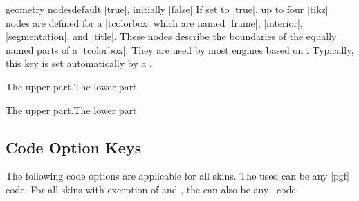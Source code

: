 \begin{docTcbKey}{geometry nodes}{}{default |true|, initially |false|}
  If set to |true|, up to four |tikz| nodes are defined for a |tcolorbox|
  which are named |frame|, |interior|, |segmentation|, and |title|. These nodes
  describe the boundaries of the equally named parts of a |tcolorbox|.
  They are used by most engines based on \tikzname.
  Typically, this key is set automatically by a .
\begin{dispExample}

\begin{tcolorbox}[adjusted title=The title]
  The upper part.\tcblower The lower part.
\end{tcolorbox}
\begin{tcolorbox}[enhanced,adjusted title=The title,
  frame code={\path[draw=red,fill=red!25]
      (frame.south west) rectangle (frame.north east);},
  interior titled code={\path[draw=blue,fill=blue!25]
      (interior.south west) rectangle (interior.north east);},
  segmentation code={\path[draw=green,fill=green!25]
      (segmentation.south west) rectangle (segmentation.north east);},
  title code={\path[draw=black,fill=brown!75!black]
      (title.south west) rectangle (title.north east);}]
  The upper part.\tcblower The lower part.
\end{tcolorbox}
\end{dispExample}
\end{docTcbKey}






\subsection{Code Option Keys}\label{subsec:addcodeoptions}
The following code options are applicable for all skins.
The used  can be any |pgf| code. For all skins
with exception of 
and , the  can also
be any \tikzname\ code.


